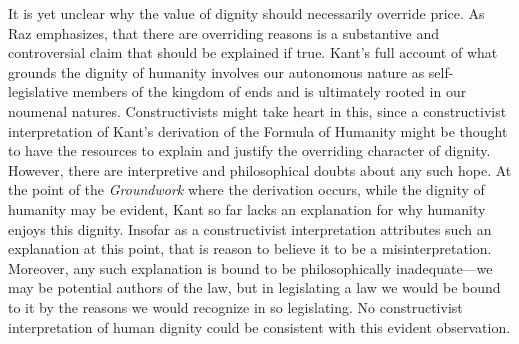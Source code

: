 \documentclass[a4paper,12pt]{article}
\begin{document}
It is yet unclear why the value of dignity should necessarily override price. As Raz emphasizes, that there are overriding reasons is a substantive and controversial claim that should be explained if true. Kant's full account of what grounds the dignity of humanity involves our autonomous nature as self-le\-gis\-la\-tive members of the kingdom of ends and is ultimately rooted in our noumenal natures. Constructivists might take heart in this, since a constructivist interpretation of Kant's derivation of the Formula of Humanity might be thought to have the resources to explain and justify the overriding character of dignity. However, there are interpretive and philosophical doubts about any such hope. At the point of the \emph{Groundwork} where the derivation occurs, while the dignity of humanity may be evident, Kant so far lacks an explanation for why humanity enjoys this dignity. Insofar as a constructivist interpretation attributes such an explanation at this point, that is reason to believe it to be a misinterpretation. Moreover, any such explanation is bound to be philosophically inadequate---we may be potential authors of the law, but in legislating a law we would be bound to it by the reasons we would recognize in so legislating. No constructivist interpretation of human dignity could be consistent with this evident observation. 
\end{document}
